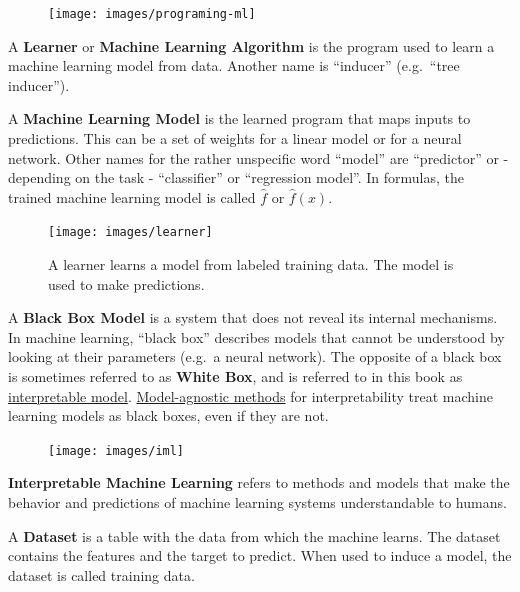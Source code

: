 \documentclass[
  10pt,
]{scrbook}
\begin{document}
\begin{figure}

{\centering \texttt{[image: images/programing-ml]} 

}

\end{figure}

A \textbf{Learner} or \textbf{Machine Learning Algorithm} is the program used to learn a machine learning model from data.
Another name is ``inducer'' (e.g.~``tree inducer'').

A \textbf{Machine Learning Model} is the learned program that maps inputs to predictions.
This can be a set of weights for a linear model or for a neural network.
Other names for the rather unspecific word ``model'' are ``predictor'' or - depending on the task - ``classifier'' or ``regression model''.
In formulas, the trained machine learning model is called \(\hat{f}\) or \(\hat{f}(x)\).

\begin{figure}

{\centering \texttt{[image: images/learner]} 

}

\caption{A learner learns a model from labeled training data. The model is used to make predictions.}\label{fig:learner-definition}
\end{figure}

A \textbf{Black Box Model} is a system that does not reveal its internal mechanisms.
In machine learning, ``black box'' describes models that cannot be understood by looking at their parameters (e.g.~a neural network).
The opposite of a black box is sometimes referred to as \textbf{White Box}, and is referred to in this book as \protect\hyperlink{simple}{interpretable model}.
\protect\hyperlink{agnostic}{Model-agnostic methods} for interpretability treat machine learning models as black boxes, even if they are not.

\begin{figure}

{\centering \texttt{[image: images/iml]} 

}

\end{figure}

\textbf{Interpretable Machine Learning} refers to methods and models that make the behavior and predictions of machine learning systems understandable to humans.

A \textbf{Dataset} is a table with the data from which the machine learns.
The dataset contains the features and the target to predict.
When used to induce a model, the dataset is called training data.
\end{document}
